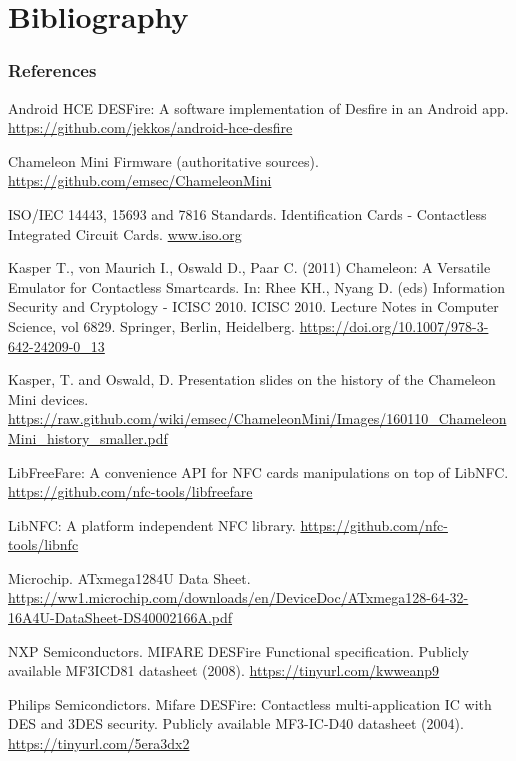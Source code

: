 \documentclass[usenames,svgnames,dvipsnames,11pt]{beamer}
\begin{document}
\section{Bibliography} 

\begin{frame}[t,allowframebreaks] 
\frametitle{References} 

\footnotesize 
\begin{thebibliography}{10}

Android HCE DESFire: A software implementation of Desfire in an Android app. 
\url{https://github.com/jekkos/android-hce-desfire}

Chameleon Mini Firmware (authoritative sources). 
\url{https://github.com/emsec/ChameleonMini}

ISO/IEC 14443, 15693 and 7816 Standards. 
Identification Cards - Contactless Integrated Circuit Cards. 
\url{www.iso.org}

Kasper T., von Maurich I., Oswald D., Paar C. (2011) 
Chameleon: A Versatile Emulator for Contactless Smartcards. In: Rhee KH., Nyang D. (eds) 
Information Security and Cryptology - ICISC 2010. ICISC 2010.
Lecture Notes in Computer Science, vol 6829. Springer, Berlin, Heidelberg. 
\url{https://doi.org/10.1007/978-3-642-24209-0_13} 

Kasper, T. and Oswald, D. Presentation slides on the history of the Chameleon Mini devices. 
\url{https://raw.github.com/wiki/emsec/ChameleonMini/Images/160110_ChameleonMini_history_smaller.pdf}

LibFreeFare: A convenience API for NFC cards manipulations on top of LibNFC. 
\url{https://github.com/nfc-tools/libfreefare}

LibNFC: A platform independent NFC library. 
\url{https://github.com/nfc-tools/libnfc}

Microchip. ATxmega1284U Data Sheet. 
\url{https://ww1.microchip.com/downloads/en/DeviceDoc/ATxmega128-64-32-16A4U-DataSheet-DS40002166A.pdf} 

NXP Semiconductors. MIFARE DESFire Functional specification. 
Publicly available MF3ICD81 datasheet (2008). 
\url{https://tinyurl.com/kwweanp9}

Philips Semicondictors. 
Mifare DESFire: Contactless multi-application IC with DES and 3DES security. 
Publicly available MF3-IC-D40 datasheet (2004). 
\url{https://tinyurl.com/5era3dx2}


\end{thebibliography}
\end{frame}
\end{document}
